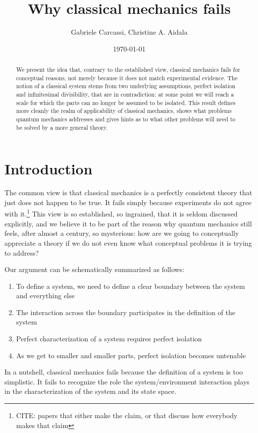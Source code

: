 \documentclass[10pt,twocolumn, nofootinbib]{revtex4-2}
\begin{document}
\title{Why classical mechanics fails}
\author{Gabriele Carcassi, Christine A. Aidala}

\date{\today}


\begin{abstract}
We present the idea that, contrary to the established view, classical mechanics fails for conceptual reasons, not merely because it does not match experimental evidence. The notion of a classical system stems from two underlying assumptions, perfect isolation and infinitesimal divisibility, that are in contradiction: at some point we will reach a scale for which the parts can no longer be assumed to be isolated. This result defines more cleanly the realm of applicability of classical mechanics, shows what problems quantum mechanics addresses and gives hints as to what other problems will need to be solved by a more general theory.
\end{abstract}

\maketitle

\section{Introduction}

The common view is that classical mechanics is a perfectly consistent theory that just does not happen to be true. It fails simply because experiments do not agree with it.\footnote{CITE: papers that either make the claim, or that discuss how everybody makes that claim} This view is so established, so ingrained, that it is seldom discussed explicitly, and we believe it to be part of the reason why quantum mechanics still feels, after almost a century, so mysterious: how are we going to conceptually appreciate a theory if we do not even know what conceptual problems it is trying to address?

Our argument can be schematically summarized as follows:
\begin{enumerate}
	\item To define a system, we need to define a clear boundary between the system and everything else
	\item The interaction across the boundary participates in the definition of the system
	\item Perfect characterization of a system requires perfect isolation
	\item As we get to smaller and smaller parts, perfect isolation becomes untenable
\end{enumerate}
In a nutshell, classical mechanics fails because the definition of a system is too simplistic. It fails to recognize the role the system/environment interaction plays in the characterization of the system and its state space.
\end{document}
